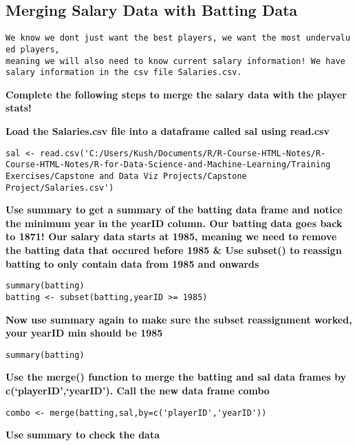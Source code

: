 \documentclass[
]{article}
\begin{document}
\hypertarget{merging-salary-data-with-batting-data}{%
\subsection{Merging Salary Data with Batting
Data}\label{merging-salary-data-with-batting-data}}

\texttt{We\ know\ we\ don\textquotesingle{}t\ just\ want\ the\ best\ players,\ we\ want\ the\ most\ undervalued\ players,}
\texttt{meaning\ we\ will\ also\ need\ to\ know\ current\ salary\ information!\ We\ have\ salary\ information\ in\ the\ csv\ file\ \textquotesingle{}Salaries.csv\textquotesingle{}.}

\textbf{Complete the following steps to merge the salary data with the
player stats!}

\textbf{Load the Salaries.csv file into a dataframe called sal using
read.csv}

\begin{verbatim}
sal <- read.csv('C:/Users/Kush/Documents/R/R-Course-HTML-Notes/R-Course-HTML-Notes/R-for-Data-Science-and-Machine-Learning/Training Exercises/Capstone and Data Viz Projects/Capstone Project/Salaries.csv')
\end{verbatim}

\textbf{Use summary to get a summary of the batting data frame and
notice the minimum year in the yearID column. Our batting data goes back
to 1871! Our salary data starts at 1985, meaning we need to remove the
batting data that occured before 1985 \& Use subset() to reassign
batting to only contain data from 1985 and onwards}

\begin{verbatim}
summary(batting)
batting <- subset(batting,yearID >= 1985)
\end{verbatim}

\textbf{Now use summary again to make sure the subset reassignment
worked, your yearID min should be 1985}

\begin{verbatim}
summary(batting)
\end{verbatim}

\textbf{Use the merge() function to merge the batting and sal data
frames by c(`playerID',`yearID'). Call the new data frame combo}

\begin{verbatim}
combo <- merge(batting,sal,by=c('playerID','yearID'))
\end{verbatim}

\textbf{Use summary to check the data}
\end{document}
